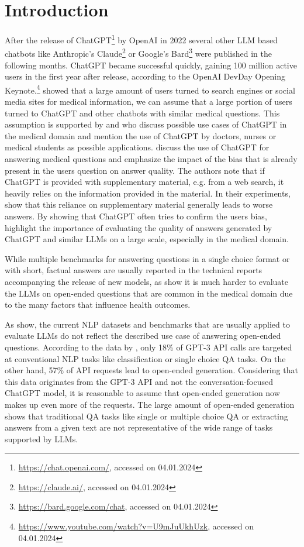 \chapter{Introduction}\label{structure}
After the release of ChatGPT\footnote{\url{https://chat.openai.com/}, accessed on 04.01.2024} by OpenAI in 2022 several other LLM based chatbots like Anthropic's Claude\footnote{\url{https://claude.ai/}, accessed on 04.01.2024} or Google's Bard\footnote{\url{https://bard.google.com/chat}, accessed on 04.01.2024} were published in the following months.
ChatGPT became successful quickly, gaining 100 million active users in the first year after release, according to the OpenAI DevDay Opening Keynote.\footnote{\url{https://www.youtube.com/watch?v=U9mJuUkhUzk}, accessed on 04.01.2024}
\cite{de:2014:seeking} showed that a large amount of users turned to search engines or social media sites for medical information, we can assume that a large portion of users turned to ChatGPT and other chatbots with similar medical questions.
This assumption is supported by \cite{dave:2023:chatgpt} and \cite{khan:2023:chatgpt} who discuss possible use cases of ChatGPT in the medical domain and mention the use of ChatGPT by doctors, nurses or medical students as possible applications.
\cite{koopman:2023:dr} discuss the use of ChatGPT for answering medical questions and emphasize the impact of the bias that is already present in the users question on answer quality. 
The authors note that if ChatGPT is provided with supplementary material, e.g. from a web search, it heavily relies on the information provided in the material.
In their experiments, \cite{koopman:2023:dr} show that this reliance on supplementary material generally leads to worse answers.
By showing that ChatGPT often tries to confirm the users bias, \cite{koopman:2023:dr} highlight the importance of evaluating the quality of answers generated by ChatGPT and similar LLMs on a large scale, especially in the medical domain.

While multiple benchmarks for answering questions in a single choice format or with short, factual answers are usually reported in the technical reports accompanying the release of new models, as \cite{xu:2023:A} show it is much harder to evaluate the LLMs on open-ended questions that are common in the medical domain due to the many factors that influence health outcomes.

As \cite{ouyang:2022:Training} show, the current NLP datasets and benchmarks that are usually applied to evaluate LLMs do not reflect the described use case of answering open-ended questions.
According to the data by \cite{ouyang:2022:Training}, only 18\% of GPT-3 API calls are targeted at conventional NLP tasks like classification or single choice QA tasks.
On the other hand, 57\% of API requests lead to open-ended generation.
Considering that this data originates from the GPT-3 API and not the conversation-focused ChatGPT model, it is reasonable to assume that open-ended generation now makes up even more of the requests.
The large amount of open-ended generation shows that traditional QA tasks like single or multiple choice QA or extracting answers from a given text are not representative of the wide range of tasks supported by LLMs.

